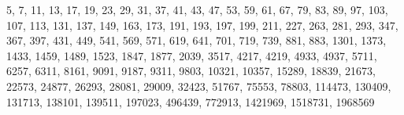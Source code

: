 5, 7, 11, 13, 17, 19, 23, 29, 31, 37, 41, 43, 47, 53, 59, 61, 67, 79, 83, 89, 97, 103, 107, 113, 131, 137, 149, 163, 173, 191, 193, 197, 199, 211, 227, 263, 281, 293, 347, 367, 397, 431, 449, 541, 569, 571, 619, 641, 701, 719, 739, 881, 883, 1301, 1373, 1433, 1459, 1489, 1523, 1847, 1877, 2039, 3517, 4217, 4219, 4933, 4937, 5711, 6257, 6311, 8161, 9091, 9187, 9311, 9803, 10321, 10357, 15289, 18839, 21673, 22573, 24877, 26293, 28081, 29009, 32423, 51767, 75553, 78803, 114473, 130409, 131713, 138101, 139511, 197023, 496439, 772913, 1421969, 1518731, 1968569